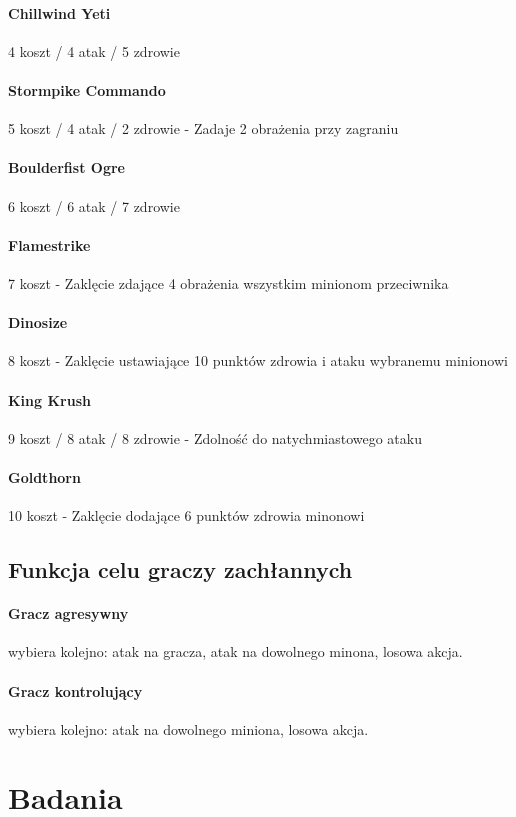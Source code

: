 \documentclass[10pt,a4paper]{article}
\begin{document}
\paragraph{Chillwind Yeti} 4 koszt / 4 atak / 5 zdrowie
\paragraph{Stormpike Commando} 5 koszt / 4 atak / 2 zdrowie - Zadaje 2 obrażenia przy zagraniu
\paragraph{Boulderfist Ogre} 6 koszt / 6 atak / 7 zdrowie
\paragraph{Flamestrike} 7 koszt - Zaklęcie zdające 4 obrażenia wszystkim minionom przeciwnika
\paragraph{Dinosize} 8 koszt - Zaklęcie ustawiające 10 punktów zdrowia i ataku wybranemu minionowi
\paragraph{King Krush} 9 koszt / 8 atak / 8 zdrowie - Zdolność do natychmiastowego ataku
\paragraph{Goldthorn} 10 koszt - Zaklęcie dodające 6 punktów zdrowia minonowi

\subsection{Funkcja celu graczy zachłannych}
\paragraph{Gracz agresywny} wybiera kolejno: atak na gracza, atak na dowolnego minona, losowa akcja.
\paragraph{Gracz kontrolujący} wybiera kolejno: atak na dowolnego miniona, losowa akcja.
\section{Badania}
\end{document}
